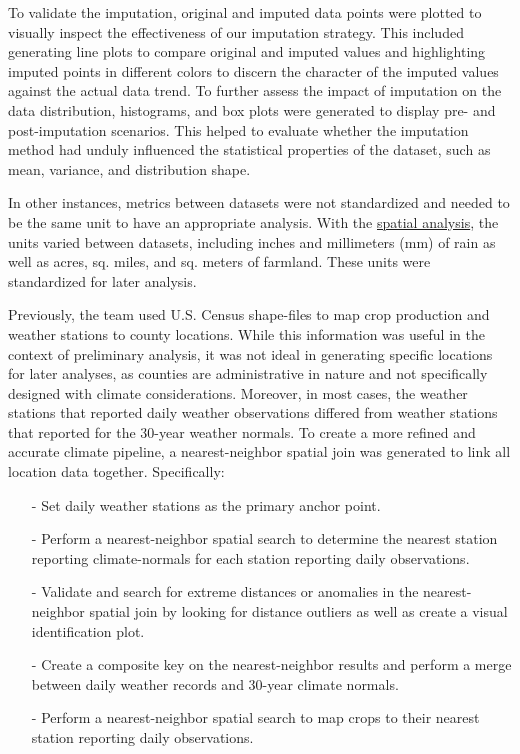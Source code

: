 \documentclass{article}
\begin{document}
To validate the imputation, original and imputed data points were plotted to visually inspect the effectiveness of our imputation strategy. This included generating line plots to compare original and imputed values and highlighting imputed points in different colors to discern the character of the imputed values against the actual data trend. To further assess the impact of imputation on the data distribution, histograms, and box plots were generated to display pre- and post-imputation scenarios. This helped to evaluate whether the imputation method had unduly influenced the statistical properties of the dataset, such as mean, variance, and distribution shape.

In other instances, metrics between datasets were not standardized and needed to be the same unit to have an appropriate analysis. With the \hyperref[sec:spatial]{spatial analysis}, the units varied between datasets, including inches and millimeters (mm) of rain as well as acres, sq. miles, and sq. meters of farmland. These units were standardized for later analysis. 

Previously, the team used U.S. Census shape-files to map crop production and weather stations to county locations. While this information was useful in the context of preliminary analysis, it was not ideal in generating specific locations for later analyses, as counties are administrative in nature and not specifically designed with climate considerations. Moreover, in most cases, the weather stations that reported daily weather observations differed from weather stations that reported for the 30-year weather normals. To create a more refined and accurate climate pipeline, a nearest-neighbor spatial join was generated to link all location data together. Specifically:

\begin{itemize}[noitemsep]
    \item[-] Set daily weather stations as the primary anchor point.
    \item[-] Perform a nearest-neighbor spatial search to determine the nearest station reporting climate-normals for each station reporting daily observations.
    \item[-] Validate and search for extreme distances or anomalies in the nearest-neighbor spatial join by looking for distance outliers as well as create a visual identification plot.
    \item[-] Create a composite key on the nearest-neighbor results and perform a merge between daily weather records and 30-year climate normals.
    \item[-] Perform a nearest-neighbor spatial search to map crops to their nearest station reporting daily observations.
\end{itemize}
\end{document}
